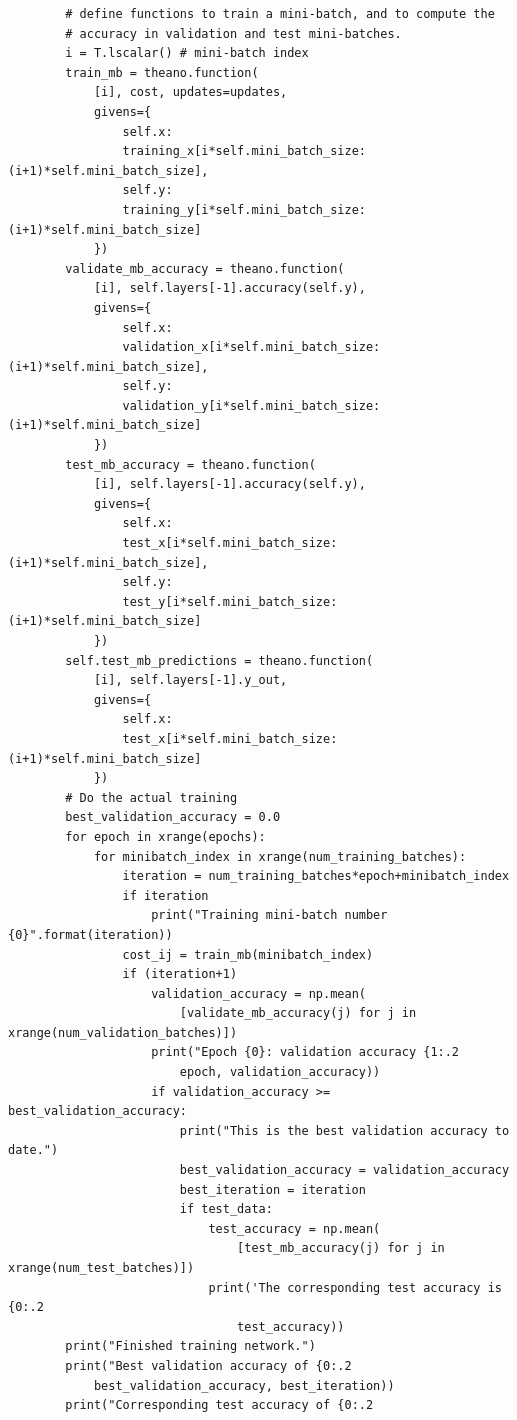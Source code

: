 \begin{lstlisting}
        # define functions to train a mini-batch, and to compute the
        # accuracy in validation and test mini-batches.
        i = T.lscalar() # mini-batch index
        train_mb = theano.function(
            [i], cost, updates=updates,
            givens={
                self.x:
                training_x[i*self.mini_batch_size: (i+1)*self.mini_batch_size],
                self.y: 
                training_y[i*self.mini_batch_size: (i+1)*self.mini_batch_size]
            })
        validate_mb_accuracy = theano.function(
            [i], self.layers[-1].accuracy(self.y),
            givens={
                self.x: 
                validation_x[i*self.mini_batch_size: (i+1)*self.mini_batch_size],
                self.y: 
                validation_y[i*self.mini_batch_size: (i+1)*self.mini_batch_size]
            })
        test_mb_accuracy = theano.function(
            [i], self.layers[-1].accuracy(self.y),
            givens={
                self.x: 
                test_x[i*self.mini_batch_size: (i+1)*self.mini_batch_size],
                self.y: 
                test_y[i*self.mini_batch_size: (i+1)*self.mini_batch_size]
            })
        self.test_mb_predictions = theano.function(
            [i], self.layers[-1].y_out,
            givens={
                self.x: 
                test_x[i*self.mini_batch_size: (i+1)*self.mini_batch_size]
            })
        # Do the actual training
        best_validation_accuracy = 0.0
        for epoch in xrange(epochs):
            for minibatch_index in xrange(num_training_batches):
                iteration = num_training_batches*epoch+minibatch_index
                if iteration 
                    print("Training mini-batch number {0}".format(iteration))
                cost_ij = train_mb(minibatch_index)
                if (iteration+1) 
                    validation_accuracy = np.mean(
                        [validate_mb_accuracy(j) for j in xrange(num_validation_batches)])
                    print("Epoch {0}: validation accuracy {1:.2
                        epoch, validation_accuracy))
                    if validation_accuracy >= best_validation_accuracy:
                        print("This is the best validation accuracy to date.")
                        best_validation_accuracy = validation_accuracy
                        best_iteration = iteration
                        if test_data:
                            test_accuracy = np.mean(
                                [test_mb_accuracy(j) for j in xrange(num_test_batches)])
                            print('The corresponding test accuracy is {0:.2
                                test_accuracy))
        print("Finished training network.")
        print("Best validation accuracy of {0:.2
            best_validation_accuracy, best_iteration))
        print("Corresponding test accuracy of {0:.2

\end{lstlisting}


